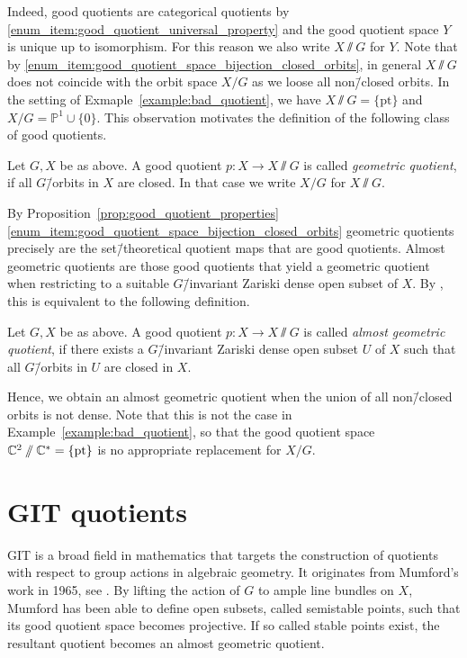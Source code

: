 Indeed, good quotients are categorical quotients by \ref{enum_item:good_quotient_universal_property} and the good quotient space $Y$ is unique up to isomorphism. For this reason we also write $X\sslash G$ for $Y$.
%
Note that by \ref{enum_item:good_quotient_space_bijection_closed_orbits}, in general $X\sslash G$ does not coincide with the orbit space $X / G$ as we loose all non\=/closed orbits. In the setting of Exmaple~\ref{example:bad_quotient}, we have $X\sslash G = \{\text{pt}\}$ and $X/G = \mathbb{P}^1 \cup \{0\}$. This observation motivates the definition of the following class of good quotients.

\begin{defi}
	Let $G, X$ be as above. A good quotient $p\colon X \rightarrow X\sslash G$ is called \emph{geometric quotient}, if all $G$\=/orbits in $X$ are closed. In that case we write $X/G$ for $X\sslash G$.
\end{defi}

By Proposition~\ref{prop:good_quotient_properties}\ref{enum_item:good_quotient_space_bijection_closed_orbits} geometric quotients precisely are the set\=/theoretical quotient maps that are good quotients. Almost geometric quotients are those good quotients that yield a geometric quotient when restricting to a suitable $G$\=/invariant Zariski dense open subset of $X$. By \cite[Proposition 5.0.11]{cls}, this is equivalent to the following definition.

\begin{defi}
	Let $G, X$ be as above. A good quotient $p\colon X \rightarrow X\sslash G$ is called \emph{almost geometric quotient}, if there exists a $G$\=/invariant Zariski dense open subset $U$ of $X$ such that all $G$\=/orbits in $U$ are closed in $X$.
\end{defi}

Hence, we obtain an almost geometric quotient when the union of all non\=/closed orbits is not dense. Note that this is not the case in Example~\ref{example:bad_quotient}, so that the good quotient space $\mathbb{C}^2 \sslash \mathbb{C}^* = \{\text{pt}\}$ is no appropriate replacement for $X/G$.

\section{GIT quotients}
\ac{GIT} is a broad field in mathematics that targets the construction of quotients with respect to group actions in algebraic geometry. It originates from Mumford's work in 1965, see \cite{git}. By lifting the action of $G$ to ample line bundles on $X$, Mumford has been able to define open subsets, called semistable points, such that its good quotient space becomes projective. If so called stable points exist, the resultant quotient becomes an almost geometric quotient.

